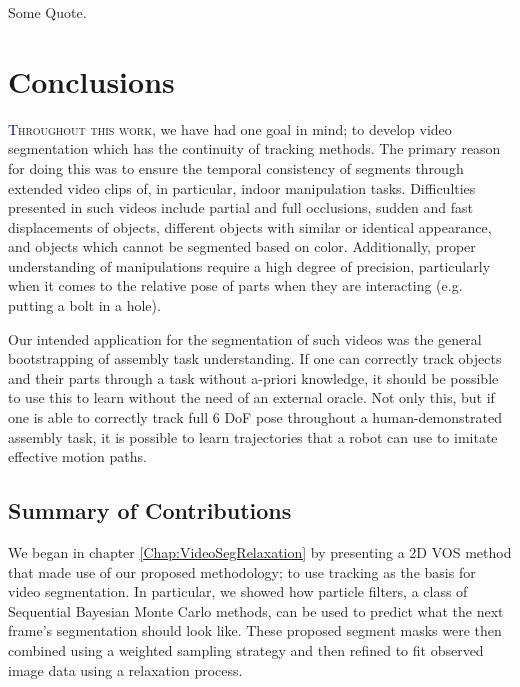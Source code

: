 \begin{savequote}[75mm]
Some Quote.
\end{savequote}


\chapter{Conclusions}
\label{Chap:Conclusions}
\lettrine[lines=3, loversize=0.3]{\textcolor{DarkBlue}T}{hroughout this work,}  we have had one goal in mind; to develop video segmentation which has the continuity of tracking methods. The primary reason for doing this was to ensure the temporal consistency of segments through extended video clips of, in particular, indoor manipulation tasks. Difficulties presented in such videos include partial and full occlusions, sudden and fast displacements of objects, different objects with similar or identical appearance, and objects which cannot be segmented based on color. Additionally, proper understanding of manipulations require a high degree of precision, particularly when it comes to the relative pose of parts when they are interacting (e.g. putting a bolt in a hole).

Our intended application for the segmentation of such videos was the general bootstrapping of assembly task understanding. If one can correctly track objects and their parts through a task without a-priori knowledge, it should be possible to use this to learn without the need of an external oracle. Not only this, but if one is able to correctly track full 6 DoF pose throughout a human-demonstrated assembly task, it is possible to learn trajectories that a robot can use to imitate effective motion paths.

\section{Summary of Contributions}
We began in chapter \ref{Chap:VideoSegRelaxation} by presenting a 2D VOS method that made use of our proposed methodology; to use tracking as the basis for video segmentation. In particular, we showed how particle filters, a class of Sequential Bayesian Monte Carlo methods, can be used to predict what the next frame's segmentation should look like. These proposed segment masks were then combined using a weighted sampling strategy and then refined to fit observed image data using a relaxation process.

